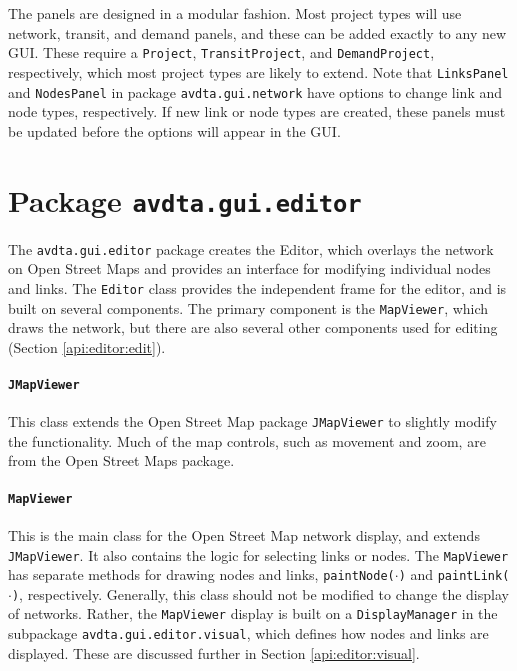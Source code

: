 The panels are designed in a modular fashion. Most project types will use network, transit, and demand panels, and these can be added exactly to any new GUI. These require a \texttt{Project}, \texttt{TransitProject}, and \texttt{DemandProject}, respectively, which most project types are likely to extend. Note that \texttt{LinksPanel} and \texttt{NodesPanel} in package \texttt{avdta.gui.network} have options to change link and node types, respectively. If new link or node types are created, these panels must be updated before the options will appear in the GUI.















\section{Package \texttt{avdta.gui.editor}}
\label{api:editor}

The \texttt{avdta.gui.editor} package creates the Editor, which overlays the network on Open Street Maps and provides an interface for modifying individual nodes and links. The \texttt{Editor} class provides the independent frame for the editor, and is built on several components. The primary component is the \texttt{MapViewer}, which draws the network, but there are also several other components used for editing (Section \ref{api:editor:edit}).

\paragraph*{\texttt{JMapViewer}} This class extends the Open Street Map package \texttt{JMapViewer} to slightly modify the functionality. Much of the map controls, such as movement and zoom, are from the Open Street Maps package.

\paragraph*{\texttt{MapViewer}} This is the main class for the Open Street Map network display, and extends \texttt{JMapViewer}. It also contains the logic for selecting links or nodes. The \texttt{MapViewer} has separate methods for drawing nodes and links, \texttt{paintNode($\cdot$)} and \texttt{paintLink($\cdot$)}, respectively. Generally, this class should not be modified to change the display of networks. Rather, the \texttt{MapViewer} display is built on a \texttt{DisplayManager} in the subpackage \texttt{avdta.gui.editor.visual}, which defines how nodes and links are displayed. These are discussed further in Section \ref{api:editor:visual}.


